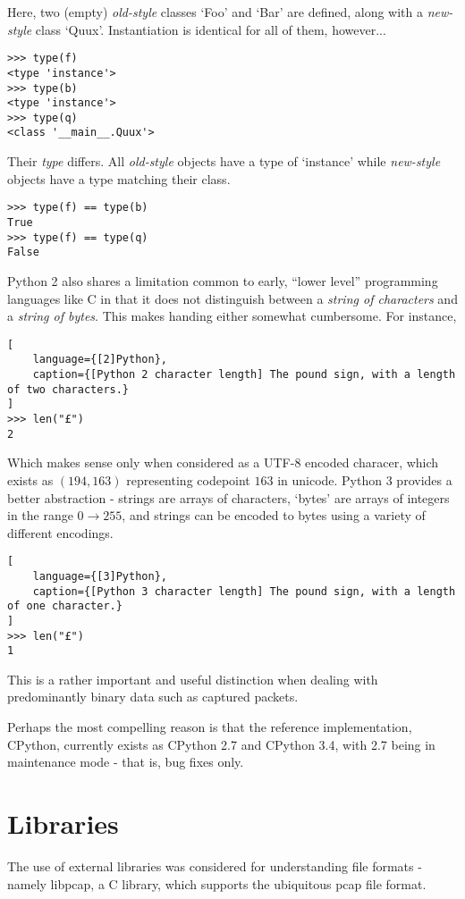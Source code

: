 \documentclass[10pt,a4paper,notitlepage]{report}
\begin{document}
Here, two (empty) \emph{old-style} classes `Foo' and `Bar' are defined, along with a \emph{new-style} class `Quux'. Instantiation is identical for all of them, however...

\begin{lstlisting}[language={[2]Python}]
>>> type(f)
<type 'instance'>
>>> type(b)
<type 'instance'>
>>> type(q)
<class '__main__.Quux'>
\end{lstlisting}

Their \emph{type} differs. All \emph{old-style} objects have a type of `instance' while \emph{new-style} objects have a type matching their class.

\begin{lstlisting}[language={[2]Python}]
>>> type(f) == type(b)
True
>>> type(f) == type(q)
False
\end{lstlisting}

Python 2 also shares a limitation common to early, ``lower level'' programming languages like C in that it does not distinguish between a \emph{string of characters} and a \emph{string of bytes}.
This makes handing either somewhat cumbersome. For instance,

\begin{lstlisting}[
    language={[2]Python},
    caption={[Python 2 character length] The pound sign, with a length of two characters.}
]
>>> len("£")
2
\end{lstlisting}

Which makes sense only when considered as a UTF-8 encoded characer, which exists as $(194, 163)$ representing codepoint $163$ in unicode.
Python 3 provides a better abstraction - strings are arrays of characters, `bytes' are arrays of integers in the range $0 \rightarrow 255$, and strings can be encoded to bytes using a variety of different encodings.

\begin{lstlisting}[
    language={[3]Python},
    caption={[Python 3 character length] The pound sign, with a length of one character.}
]
>>> len("£")
1
\end{lstlisting}

This is a rather important and useful distinction when dealing with predominantly binary data such as captured packets.

Perhaps the most compelling reason is that the reference implementation, CPython, currently exists as CPython 2.7 and CPython 3.4, with 2.7 being in maintenance mode\cite{cpy2maint} - that is, bug fixes only.

\section{Libraries}
The use of external libraries was considered for understanding file formats - namely libpcap, a C library, which supports the ubiquitous pcap file format.
\end{document}
